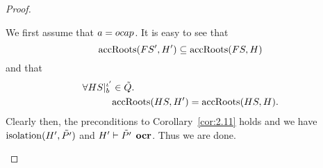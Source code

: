 \begin{proof}
\begin{description}
\begin{description}
          We first assume that $a = \mbox{$ocap$}$. It is easy to see that
          \begin{equation}
            \mbox{$\mathrm{accRoots}$}(FS', H') \subseteq \mbox{$\mathrm{accRoots}$}(FS, H)
          \end{equation}
          and that
          \begin{equation}
            \begin{aligned}
              \forall HS|_b^{\iota'} &\in \tilde{Q}. \\
              &\mbox{$\mathrm{accRoots}$}(HS, H') = \mbox{$\mathrm{accRoots}$}(HS, H).
            \end{aligned}
          \end{equation}
          Clearly then, the preconditions to Corollary~\ref{cor:2.11} holds and
          we have $\mbox{$\mathrm{isolation}$}(H', \tilde{P'})$ and $H' \vdash \tilde{P'} \:\:
          \mbox{\bf ocr}$. Thus we are done.


\end{description}
\end{description}
\end{proof}
